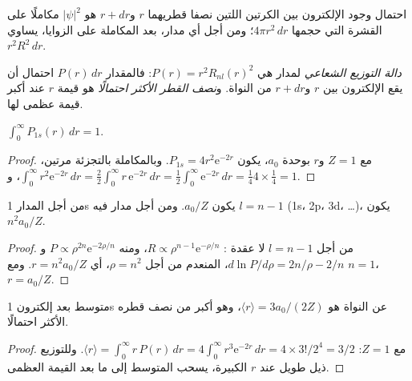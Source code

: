 احتمال وجود الإلكترون بين الكرتين اللتين نصفا قطريهما $r$ و$r +
dr$ هو $|\psi|^2$ مكاملًا على القشرة التي حجمها $4\pi r^2\,dr$؛ ومن أجل أي
مدار، بعد المكاملة على الزوايا، يساوي $r^2R^2\,dr$.

\begin{definition}\label{def:b2:atomic-orbitals:radial-distribution}
\emph{دالة التوزيع الشعاعي}
لمدار هي $P(r) = r^2R_{nl}(r)^2$: فالمقدار $P(r)\,dr$ احتمال أن يقع
الإلكترون بين $r$ و$r + dr$ من النواة. و\emph{نصف القطر الأكثر
احتمالًا} هو قيمة $r$ عند أكبر قيمة عظمى لها.
\end{definition}

\begin{proposition}\label{prop:b2:atomic-orbitals:normalised}
$\int_0^\infty P_{1s}(r)\,dr = 1$.
\end{proposition}

\begin{proof}
مع $Z = 1$ و$r$ بوحدة $a_0$، يكون $P_{1s} = 4r^2\mathrm e^{-2r}$. وبالمكاملة بالتجزئة مرتين،
$\int_0^\infty r^2\mathrm e^{-2r}\,dr = \frac22\int_0^\infty r\,\mathrm e^{-2r}\,dr =
\frac12\int_0^\infty\mathrm e^{-2r}\,dr = \frac14$، و$4 \times \frac14 = 1$.
\end{proof}

\begin{proposition}\label{prop:b2:atomic-orbitals:most-probable}
من أجل المدار 1s يكون  $a_0/Z$. ومن أجل مدار فيه $l =
n - 1$ (1s، 2p، 3d، \dots)، يكون $n^2a_0/Z$.
\end{proposition}

\begin{proof}
من أجل $l = n - 1$ لا عقدة : $R \propto \rho^{n-1}\mathrm e^{-\rho/n}$،
ومنه $P \propto \rho^{2n}\mathrm e^{-2\rho/n}$ و$d\ln P/d\rho = 2n/\rho - 2/n$، المنعدم
من أجل $\rho = n^2$، أي $r = n^2a_0/Z$. ومع $n = 1$، $r = a_0/Z$.
\end{proof}

\begin{proposition}\label{prop:b2:atomic-orbitals:mean-radius}
متوسط بعد إلكترون 1s عن النواة هو $\langle r\rangle = 3a_0/(2Z)$،
وهو أكبر من نصف قطره الأكثر احتمالًا.
\end{proposition}

\begin{proof}
مع $Z = 1$: $\langle r\rangle = \int_0^\infty r\,P(r)\,dr = 4\int_0^\infty r^3\mathrm e^{-2r}
\,dr = 4 \times 3!/2^4 = 3/2$. وللتوزيع ذيل طويل عند $r$ الكبيرة،
يسحب المتوسط إلى ما بعد القيمة العظمى.
\end{proof}

